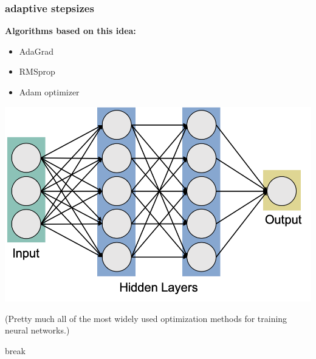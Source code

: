 \documentclass[compress]{beamer}
\newcommand{\bv}[1]{\mathbf{#1}}
\begin{document}
\begin{frame}
	\frametitle{adaptive stepsizes}
	\textbf{Algorithms based on this idea:}
	\begin{itemize}
		\item AdaGrad
		\item RMSprop
		\item Adam optimizer
	\end{itemize}
	\begin{center}
		\includegraphics[width=.5\textwidth]{neuralNetwork.png}
		
		\alert{(Pretty much all of the most widely used optimization methods for training neural networks.)}
	\end{center}
\end{frame}

\begin{frame}[standout]
	\begin{center}
		\large break
	\end{center}
\end{frame}

	

	
\end{document}
